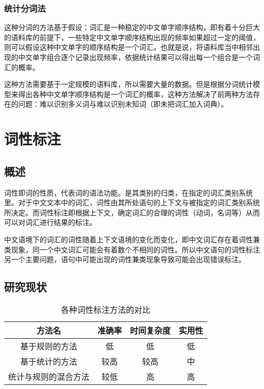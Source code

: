 \subsubsection{统计分词法}
这种分词的方法基于假设：词汇是一种稳定的中文单字顺序结构，即有着十分巨大的语料库的前提下，一些特定中文单字顺序结构出现的频率如果超过一定的阈值，则可以假设这种中文单字的顺序结构是一个词汇。也就是说，将语料库当中相邻出现的中文单字组合逐个记录出现频率，依据统计结果可以得出每一个组合是一个词汇的概率。

这种方法需要基于一定规模的语料库，所以需要大量的数据。但是根据分词统计模型来得出各种中文单字顺序结构是一个词汇的概率，这种方法解决了前两种方法存在的问题：难以识别多义词与难以识别未知词（即未把词汇加入词典）。

\section{词性标注}
\subsection{概述}
词性即词的性质，代表词的语法功能。是其类别的归类，在指定的词汇类别系统里。对于中文文本中的词汇，词性由其所处语句的上下文与被指定的词汇类别系统所决定。而词性标注即根据上下文，确定词汇的合理的词性（动词，名词等）从而可以对词汇进行结果的标注。

中文语境下的词汇的词性随着上下文语境的变化而变化，即中文词汇存在着词性兼类现象，同一个中文词汇可能会有着数个不相同的词性。所以中文语句的词性标注另一个主要问题，语句中可能出现的词性兼类现象导致可能会出现错误标注。

\subsection{研究现状}

\begin{table}[htbp]
\centering
\caption[词性标注方法对比]{各种词性标注方法的对比} \label{tab:simpletable}
\begin{tabular}{|c|c|c|c|}
    \hline
    方法名 & 准确率 & 时间复杂度 & 实用性 \\
    \hline
    基于规则的方法 & 低 & 低 & 低 \\
    \hline
    基于统计的方法 & 较高 & 较高 & 中 \\
    \hline
    统计与规则的混合方法 & 较低 & 高 & 高 \\
    \hline
\end{tabular}
\end{table}

